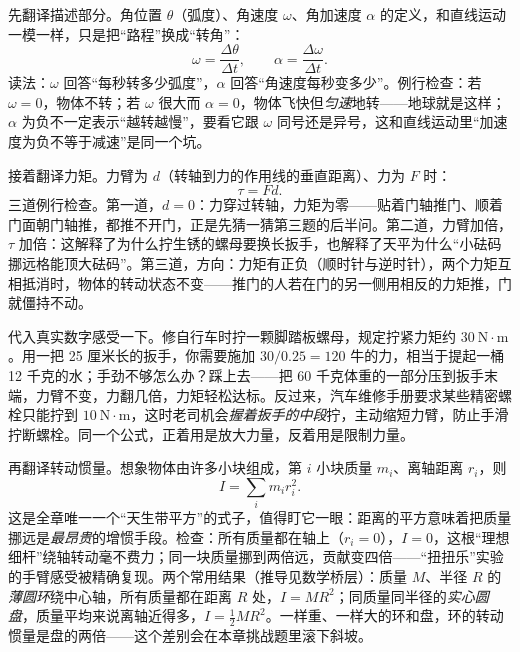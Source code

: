 \begin{mainline}
先翻译描述部分。角位置 \(\theta\)（弧度）、角速度 \(\omega\)、角加速度 \(\alpha\) 的定义，和直线运动一模一样，只是把“路程”换成“转角”：
\[
  \omega=\frac{\Delta\theta}{\Delta t},\qquad
  \alpha=\frac{\Delta\omega}{\Delta t}.
\]
读法：\(\omega\) 回答“每秒转多少弧度”，\(\alpha\) 回答“角速度每秒变多少”。例行检查：若 \(\omega=0\)，物体不转；若 \(\omega\) 很大而 \(\alpha=0\)，物体飞快但\emph{匀速}地转——地球就是这样；\(\alpha\) 为负不一定表示“越转越慢”，要看它跟 \(\omega\) 同号还是异号，这和直线运动里“加速度为负不等于减速”是同一个坑。

接着翻译力矩。力臂为 \(d\)（转轴到力的作用线的垂直距离）、力为 \(F\) 时：
\[
  \tau=Fd .
\]
三道例行检查。第一道，\(d=0\)：力穿过转轴，力矩为零——贴着门轴推门、顺着门面朝门轴推，都推不开门，正是先猜一猜第三题的后半问。第二道，力臂加倍，\(\tau\) 加倍：这解释了为什么拧生锈的螺母要换长扳手，也解释了天平为什么“小砝码挪远格能顶大砝码”。第三道，方向：力矩有正负（顺时针与逆时针），两个力矩互相抵消时，物体的转动状态不变——推门的人若在门的另一侧用相反的力矩推，门就僵持不动。

代入真实数字感受一下。修自行车时拧一颗脚踏板螺母，规定拧紧力矩约 \(30\ \mathrm{N\cdot m}\)。用一把 25 厘米长的扳手，你需要施加 \(30/0.25=120\) 牛的力，相当于提起一桶 12 千克的水；手劲不够怎么办？踩上去——把 60 千克体重的一部分压到扳手末端，力臂不变，力翻几倍，力矩轻松达标。反过来，汽车维修手册要求某些精密螺栓只能拧到 \(10\ \mathrm{N\cdot m}\)，这时老司机会\emph{握着扳手的中段}拧，主动缩短力臂，防止手滑拧断螺栓。同一个公式，正着用是放大力量，反着用是限制力量。

再翻译转动惯量。想象物体由许多小块组成，第 \(i\) 小块质量 \(m_i\)、离轴距离 \(r_i\)，则
\[
  I=\sum_i m_i r_i^2 .
\]
这是全章唯一一个“天生带平方”的式子，值得盯它一眼：距离的平方意味着把质量挪远是\emph{最昂贵}的增惯手段。检查：所有质量都在轴上（\(r_i=0\)），\(I=0\)，这根“理想细杆”绕轴转动毫不费力；同一块质量挪到两倍远，贡献变四倍——“扭扭乐”实验的手臂感受被精确复现。两个常用结果（推导见数学桥层）：质量 \(M\)、半径 \(R\) 的\emph{薄圆环}绕中心轴，所有质量都在距离 \(R\) 处，\(I=MR^2\)；同质量同半径的\emph{实心圆盘}，质量平均来说离轴近得多，\(I=\tfrac12 MR^2\)。一样重、一样大的环和盘，环的转动惯量是盘的两倍——这个差别会在本章挑战题里滚下斜坡。

\begin{center}
\end{center}


\end{mainline}

